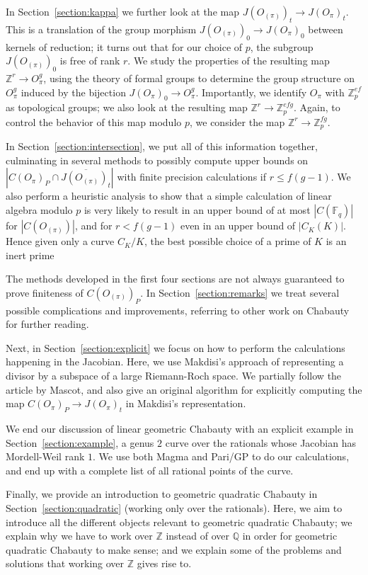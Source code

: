 \documentclass[12pt]{article}
\newcommand{\Z}{\mathbb{Z}}
\newcommand{\Q}{\mathbb{Q}}
\newcommand{\F}{\mathbb{F}}
\theoremstyle{plain}
\theoremstyle{definition}
\theoremstyle{remark}
\begin{document}
In Section~\ref{section:kappa} we further look at the map $J(O_{(\pi)})_t \to J(O_\pi)_t$. This is a translation of the group morphism $J(O_{(\pi)})_0 \to J(O_\pi)_0$ between kernels of reduction; it turns out that for our choice of $p$, the subgroup $J(O_{(\pi)})_0$ is free of rank $r$. We study the properties of the resulting map $\Z^r \to O_\pi^g$, using the theory of formal groups to determine the group structure on $O_\pi^g$ induced by the bijection $J(O_\pi)_0 \to O_\pi^g$. {\color{red} Importantly, we identify $O_\pi$ with $\Z_p^{ef}$ as topological groups; we also look at the resulting map $\Z^r \to \Z_p^{efg}$. Again, to control the behavior of this map modulo $p$, we consider the map $\Z^r \to \Z_p^{fg}$.}

In Section~\ref{section:intersection}, we put all of this information together, culminating in several methods to possibly compute upper bounds on $\left|C(O_\pi)_P \cap \overline{J(O_{(\pi)})_t}\right|$ with finite precision calculations if $r \leq f(g-1)$. We also perform a heuristic analysis to show that a simple calculation of linear algebra modulo $p$ is very likely to result in an upper bound of at most $|C(\F_q)|$ for $|C(O_{(\pi)})|$, and for $r < f(g-1)$  even in an upper bound of $|C_K(K)|$. Hence given only a curve $C_K/K$, the best possible choice of a prime of $K$ is an inert prime

The methods developed in the first four sections are not always guaranteed to prove finiteness of $C(O_{(\pi)})_P$. In Section~\ref{section:remarks} we treat several possible complications and improvements, referring to other work on Chabauty for further reading.

Next, in Section~\ref{section:explicit} we focus on how to perform the calculations happening in the Jacobian. Here, we use Makdisi's approach of representing a divisor by a subspace of a large Riemann-Roch space. We partially follow the article \cite{mascot18} by Mascot, and also give an original algorithm for explicitly computing the map $C(O_{\pi})_P \to J(O_{\pi})_t$ in Makdisi's representation.

We end our discussion of linear geometric Chabauty with an explicit example in Section~\ref{section:example}, a genus $2$ curve over the rationals whose Jacobian has Mordell-Weil rank $1$. We use both Magma and Pari/GP to do our calculations, and end up with a complete list of all rational points of the curve.

Finally, we provide an introduction to geometric quadratic Chabauty in Section~\ref{section:quadratic} (working only over the rationals). Here, we aim to introduce all the different objects relevant to geometric quadratic Chabauty; we explain why we have to work over $\Z$ instead of over $\Q$ in order for geometric quadratic Chabauty to make sense; and we explain some of the problems and solutions that working over $\Z$ gives rise to.
\end{document}
